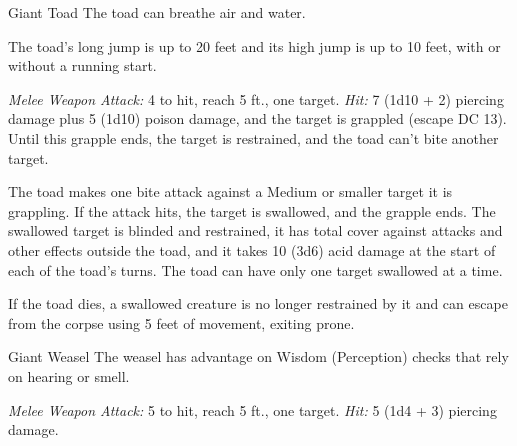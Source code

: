 \documentclass[10pt,a4paper,twoside,bg=print,twocolumn,openany,nodeprecatedcode]{dndbook}
\begin{document}
\begin{DndMonster}[float=t]{Giant Toad}
\DndMonsterBasics[
armor-class = {11},
hit-points = {\DndDice{6d10 + 6}},
speed = {20 ft., swim 40 ft.}
]
\DndMonsterAbilityScores[
 str = 15,
 dex = 13,
 con = 13,
 int = 2,
 wis = 10,
 cha = 3
]
\DndMonsterDetails[
senses = {darkvision 30 ft., passive perception 10},
challenge = 1,
]
The toad can breathe air and water.

The toad's long jump is up to 20 feet and its high jump is up to 10 feet, with or without a running start.

\textsl{Melee Weapon Attack:} 4 to hit, reach 5 ft., one target. \textsl{Hit:} 7 (1d10 + 2) piercing damage plus 5 (1d10) poison damage, and the target is grappled (escape DC 13). Until this grapple ends, the target is restrained, and the toad can't bite another target.

The toad makes one bite attack against a Medium or smaller target it is grappling. If the attack hits, the target is swallowed, and the grapple ends. The swallowed target is blinded and restrained, it has total cover against attacks and other effects outside the toad, and it takes 10 (3d6) acid damage at the start of each of the toad's turns. The toad can have only one target swallowed at a time.

If the toad dies, a swallowed creature is no longer restrained by it and can escape from the corpse using 5 feet of movement, exiting prone.

\end{DndMonster}



\begin{DndMonster}[float=t]{Giant Weasel}
\DndMonsterBasics[
armor-class = {13},
hit-points = {\DndDice{2d8}},
speed = {40 ft.}
]
\DndMonsterAbilityScores[
 str = 11,
 dex = 16,
 con = 10,
 int = 4,
 wis = 12,
 cha = 5
]
\DndMonsterDetails[
skills = {Perception +3, Stealth +5},
senses = {darkvision 60 ft., passive perception 13},
challenge = 1/8,
]
The weasel has advantage on Wisdom (Perception) checks that rely on hearing or smell.

\textsl{Melee Weapon Attack:} 5 to hit, reach 5 ft., one target. \textsl{Hit:} 5 (1d4 + 3) piercing damage.

\end{DndMonster}
\end{document}
